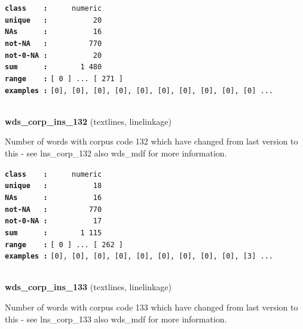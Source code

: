 \documentclass[]{article}
\begin{document}
\textbf{\texttt{class\ \ \ \ :}} \texttt{~~~~~numeric}\\
\textbf{\texttt{unique\ \ \ :}} \texttt{~~~~~~~~~~20}\\
\textbf{\texttt{NAs\ \ \ \ \ \ :}} \texttt{~~~~~~~~~~16}\\
\textbf{\texttt{not-NA\ \ \ :}} \texttt{~~~~~~~~~770}\\
\textbf{\texttt{not-0-NA\ :}} \texttt{~~~~~~~~~~20}\\
\textbf{\texttt{sum\ \ \ \ \ \ :}} \texttt{~~~~~~~1~480}\\
\textbf{\texttt{range\ \ \ \ :}}
\texttt{{[}\ 0\ {]}\ ...\ {[}\ 271\ {]}}\\
\textbf{\texttt{examples\ :}}
\texttt{{[}0{]},\ {[}0{]},\ {[}0{]},\ {[}0{]},\ {[}0{]},\ {[}0{]},\ {[}0{]},\ {[}0{]},\ {[}0{]},\ {[}0{]}\ ...}\\

~

\textbf{wds\_corp\_ins\_132} (textlines, linelinkage)

Number of words with corpus code 132 which have changed from last
version to this - see lns\_corp\_132 also wds\_mdf for more information.

\textbf{\texttt{class\ \ \ \ :}} \texttt{~~~~~numeric}\\
\textbf{\texttt{unique\ \ \ :}} \texttt{~~~~~~~~~~18}\\
\textbf{\texttt{NAs\ \ \ \ \ \ :}} \texttt{~~~~~~~~~~16}\\
\textbf{\texttt{not-NA\ \ \ :}} \texttt{~~~~~~~~~770}\\
\textbf{\texttt{not-0-NA\ :}} \texttt{~~~~~~~~~~17}\\
\textbf{\texttt{sum\ \ \ \ \ \ :}} \texttt{~~~~~~~1~115}\\
\textbf{\texttt{range\ \ \ \ :}}
\texttt{{[}\ 0\ {]}\ ...\ {[}\ 262\ {]}}\\
\textbf{\texttt{examples\ :}}
\texttt{{[}0{]},\ {[}0{]},\ {[}0{]},\ {[}0{]},\ {[}0{]},\ {[}0{]},\ {[}0{]},\ {[}0{]},\ {[}0{]},\ {[}3{]}\ ...}\\

~

\textbf{wds\_corp\_ins\_133} (textlines, linelinkage)

Number of words with corpus code 133 which have changed from last
version to this - see lns\_corp\_133 also wds\_mdf for more information.
\end{document}
